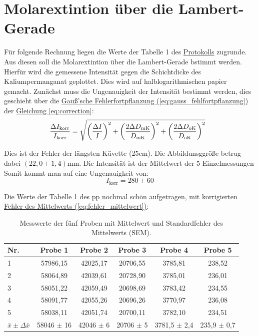 \twocolumn

\section{Molarextintion über die Lambert-Gerade}
Für folgende Rechnung liegen die Werte der Tabelle 1 des \hyperref[Protokoll]{Protokolls} zugrunde. Aus diesen soll die Molarextintion über die Lambert-Gerade bstimmt werden. Hierfür wird die gemessene Intensität gegen die Schichtdicke des Kaliumpermanganat geplottet. Dies wird auf halblogarithmischen papier gemacht. Zunächst muss die Ungenauigkeit der Intensität bestimmt werden, dies geschieht über die \hyperref[eq:gauss_fehlfortpflanzung]{Gauß'sche Fehlerfortpflanzung (\ref*{eq:gauss_fehlfortpflanzung})} der \hyperref[eq:correction]{Gleichung \ref*{eq:correction}}:
\begin{equation}
    \hspace{-0.25cm}
    \frac{\Delta I_{\text{korr}}}{I_{\text{korr}}} = \sqrt{\left(\frac{\Delta I}{I}\right)^2 + \left(\frac{2 \Delta D_{\text{mK}}}{D_{\text{mK}}}\right)^2 + \left(\frac{2 \Delta D_{\text{oK}}}{D_{\text{oK}}}\right)^2}
\end{equation}


Dies ist der Fehler der längsten Küvette (25cm). Die Abbildunsggröße betrug dabei $(22,0 \pm 1,4) \mathrm{mm}$. Die Intensität ist der Mittelwert der 5 Einzelmessungen Somit kommt man auf eine Ungenauigkeit von:
\begin{equation}
    I_{\text{korr}} = 280 \pm 60
\end{equation}

Die Werte der Tabelle 1 des pp nochmal schön aufgetragen, mit korrigierten \hyperref[eq:fehler_mittelwert]{Fehler des Mittelwerts (\ref*{eq:fehler_mittelwert})}:
\begin{table}[b!]
    \onecolumn
    \centering
    \begin{tabular}{l | ccccc}
    \hline
    Nr. & Probe 1 & Probe 2 & Probe 3 & Probe 4 & Probe 5 \\
    \hline
    1 & 57986,15 & 42025,17 & 20706,55 & 3785,81 & 238,52 \\
    2 & 58064,89 & 42039,61 & 20728,90 & 3785,01 & 236,01 \\
    3 & 58051,22 & 42059,49 & 20698,69 & 3783,42 & 234,55 \\
    4 & 58091,77 & 42055,26 & 20696,26 & 3770,97 & 236,08 \\
    5 & 58038,11 & 42051,74 & 20700,11 & 3782,10 & 234,51 \\
    \hline
    $\bar{x} \pm \Delta \bar{x}$ & 58046 $\pm$ 16 & 42046 $\pm$ 6 & 20706 $\pm$ 5 & 3781,5 $\pm$ 2,4 & 235,9 $\pm$ 0,7 \\
    \hline
    \end{tabular}
    \caption{Messwerte der fünf Proben mit Mittelwert und Standardfehler des Mittelwerts (SEM).}
    \twocolumn
\end{table}

